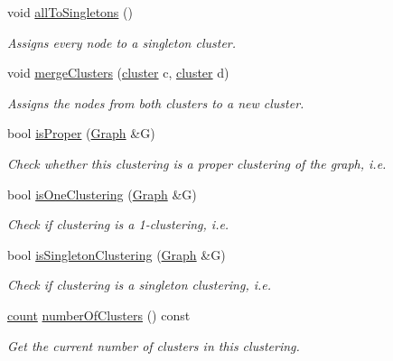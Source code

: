 \begin{DoxyCompactItemize}
void \hyperlink{class_networ_kit_1_1_clustering_a777f65aa262cbed40eb1c85721250026}{all\-To\-Singletons} ()
\begin{DoxyCompactList}\small\item\em Assigns every node to a singleton cluster. \end{DoxyCompactList}\item 
void \hyperlink{class_networ_kit_1_1_clustering_a24c93a541401003305e358bb03682d22}{merge\-Clusters} (\hyperlink{namespace_networ_kit_a189884f50c41226806b31842d2214b71}{cluster} c, \hyperlink{namespace_networ_kit_a189884f50c41226806b31842d2214b71}{cluster} d)
\begin{DoxyCompactList}\small\item\em Assigns the nodes from both clusters to a new cluster. \end{DoxyCompactList}\item 
bool \hyperlink{class_networ_kit_1_1_clustering_a65ee5f83e25a5e3ccae11c98eb55a7b8}{is\-Proper} (\hyperlink{class_networ_kit_1_1_graph}{Graph} \&G)
\begin{DoxyCompactList}\small\item\em Check whether this clustering is a proper clustering of the graph, i.\-e. \end{DoxyCompactList}\item 
bool \hyperlink{class_networ_kit_1_1_clustering_a11ce4cb3018fd1cdf7d7269cc8a71448}{is\-One\-Clustering} (\hyperlink{class_networ_kit_1_1_graph}{Graph} \&G)
\begin{DoxyCompactList}\small\item\em Check if clustering is a 1-\/clustering, i.\-e. \end{DoxyCompactList}\item 
bool \hyperlink{class_networ_kit_1_1_clustering_acd4d66f85e524baa081ca6e1306de290}{is\-Singleton\-Clustering} (\hyperlink{class_networ_kit_1_1_graph}{Graph} \&G)
\begin{DoxyCompactList}\small\item\em Check if clustering is a singleton clustering, i.\-e. \end{DoxyCompactList}\item 
\hyperlink{namespace_networ_kit_a76b399edfa50ae72e4aa86007aaa800a}{count} \hyperlink{class_networ_kit_1_1_clustering_a5d70e71e3c6b0082c0ab4035e1b65f79}{number\-Of\-Clusters} () const 
\begin{DoxyCompactList}\small\item\em Get the current number of clusters in this clustering. \end{DoxyCompactList}\item 

\end{DoxyCompactItemize}
